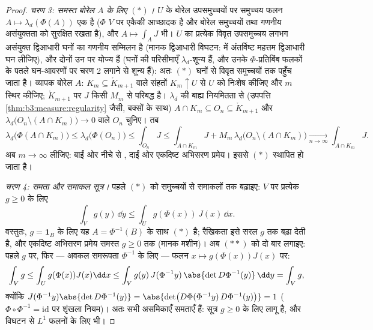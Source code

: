 \begin{proof}
\emph{चरण 3: समस्त बोरेल $A$ के लिए $(*)$।} $U$ के बोरेल
उपसमुच्चयों पर समुच्चय फलन $A
\mapsto \lambda_d(\Phi(A))$ एक  है ($\Phi$ $V$ पर एकैकी
आच्छादक है और बोरेल समुच्चयों तथा गणनीय असंयुक्तता को सुरक्षित
रखता है), और $A \mapsto \int_AJ$ भी। $U$ का प्रत्येक विवृत उपसमुच्चय लगभग
असंयुक्त द्विआधारी  घनों का गणनीय सम्मिलन है (मानक द्विआधारी
विघटन:  में अंतर्विष्ट महत्तम द्विआधारी घन लीजिए),
और दोनों  उन पर योज्य हैं (घनों की परिसीमाएँ $\lambda_d$-शून्य हैं,
और उनके $\Phi$-प्रतिबिंब फलकों के पतले घन-आवरणों पर चरण 2 लगाने से
शून्य हैं): अतः $(*)$ घनों से विवृत समुच्चयों तक पहुँच जाता है।
व्यापक बोरेल $A$: $K_m \subseteq
\mathring K_{m+1}$ वाले संहतों $K_m \uparrow U$ से $U$ को निःशेष
कीजिए और $m$ स्थिर कीजिए; $\mathring K_{m+1}$ पर $J$ किसी $M_m$ से परिबद्ध
है। $\lambda_d$ की बाह्य नियमितता से (उपपत्ति \cref{thm:b3:measure:regularity} जैसी, बक्सों के
साथ) $A \cap K_m \subseteq O_n
\subseteq \mathring K_{m+1}$ और $\lambda_d\bigl(O_n \setminus
(A\cap K_m)\bigr) \to 0$ वाले  $O_n$ चुनिए। तब
\[
\lambda_d\bigl(\Phi(A\cap K_m)\bigr) \leq
\lambda_d\bigl(\Phi(O_n)\bigr) \leq \int_{O_n}J
\leq \int_{A\cap K_m}J + M_m\,\lambda_d\bigl(O_n\setminus(A\cap
K_m)\bigr) \xrightarrow[n\to\infty]{} \int_{A\cap K_m}J .
\]
अब $m \to \infty$ लीजिए: बाईं ओर नीचे से , दाईं ओर एकदिष्ट अभिसरण
प्रमेय। इससे $(*)$ स्थापित हो जाता है।

\emph{चरण 4: समता और समाकल सूत्र।} पहले $(*)$ को समुच्चयों से
समाकलों तक बढ़ाइए: $V$ पर प्रत्येक  $g
\geq 0$ के लिए
\[
\int_V g(y)\,\dd y \leq \int_U g(\Phi(x))\,J(x)\,\dd x .
\tag{$**$}
\]
वस्तुतः, $g = \mathbf 1_B$ के लिए यह $A =
\Phi^{-1}(B)$ के साथ $(*)$ है; रैखिकता इसे सरल
$g$ तक बढ़ा देती है, और एकदिष्ट अभिसरण प्रमेय समस्त $g \geq 0$ तक
(मानक मशीन)। अब $(**)$ को दो बार लगाइए: पहले $g$ पर, फिर ---
अवकल समरूपता $\Phi^{-1}$ के लिए --- फलन $x \mapsto g(\Phi(x))J(x)$ पर:
\[
\int_Vg \leq \int_U g(\Phi(x))J(x)\dd x
\leq \int_V g(y)\,J(\Phi^{-1}y)\,\abs{\det
D\Phi^{-1}(y)}\,\dd y = \int_V g ,
\]
क्योंकि $J(\Phi^{-1}y)\abs{\det D\Phi^{-1}(y)} = \abs{\det\bigl(
D\Phi(\Phi^{-1}y)\,D\Phi^{-1}(y)\bigr)} = 1$ ($\Phi\circ\Phi^{-1} = \mathrm{id}$ पर शृंखला नियम)। अतः सभी असमिकाएँ समताएँ
हैं: सूत्र $g \geq 0$ के लिए लागू है, और विघटन से $L^1$ फलनों के लिए
भी।
\end{proof}

